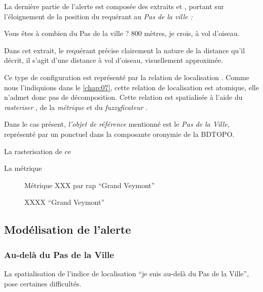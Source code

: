 
La dernière partie de l'alerte est composée des extraits  et
, portant sur l'éloignement de la position du requérant au
\emph{Pas de la ville :}
%
\begin{dialogue}
  \Sec {} Vous êtes à combien du Pas de la ville ?
  \Req {}  800 mètres, je crois, à vol d'oiseau.
\end{dialogue}
%
Dans cet extrait, le requérant précise clairement la nature de la
distance qu'il décrit, il s'agit d'une distance à vol d'oiseau,
visuellement approximée.

Ce type de configuration est représenté par la relation de
localisation
. Comme nous
l'indiquions dans le \autoref{chap:07}, cette relation de localisation
est atomique, elle n'admet donc pas de décomposition.
%
Cette relation est spatialisée à l'aide du \emph{rasteriser}
, de la \emph{métrique}  et
du \emph{fuzzyficateur} .

Dans le cas présent, \emph{l'objet de référence} mentionné est le
\emph{Pas de la Ville,} représenté par un ponctuel dans la composante
oronymie de la BDTOPO.

La rasterisation de ce

La métrique 


\begin{figure}
  \centering
  
  \caption{Métrique XXX par rap  \enquote{Grand Veymont}}
  \label{fig:veyont_distance}
\end{figure}



\begin{figure}
  \centering
  
  \caption{XXXX \enquote{Grand Veymont}}
  \label{fig:fuzzy_veyont_distance}
\end{figure}


\subsection{Modélisation de l'alerte}
\label{subsec:9-2-2}


\subsubsection{Au-delà du Pas de la Ville}

La spatialisation de l'indice de localisation \enquote{je suis au-delà
  du Pas de la Ville}, pose certaines difficultés.

